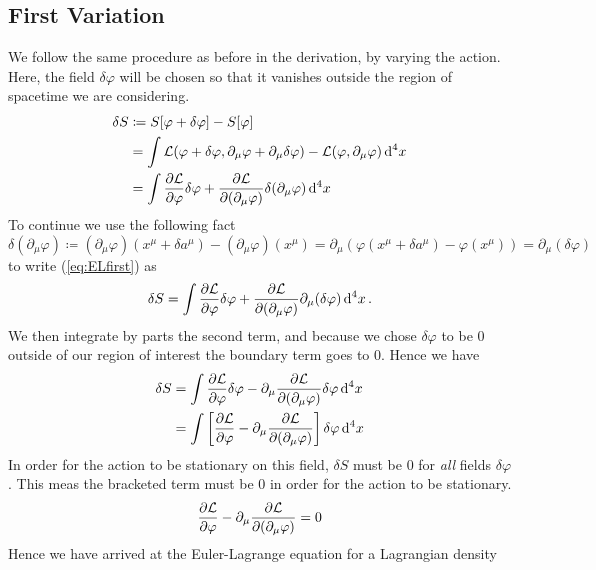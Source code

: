\subsection{First Variation}
We follow the same procedure as before in the derivation, by varying the action.
Here, the field \(\delta\varphi\) will be chosen so that it vanishes outside the
region of spacetime we are considering.
\begin{align}\label{eq:ELfirst}
    \delta S & \coloneqq S[\varphi + \delta\varphi] - S[\varphi] \nonumber\\
             & = \int \mathcal{L}(\varphi + \delta\varphi, \partial_\mu\varphi + \partial_\mu\delta\varphi) - \mathcal{L}(\varphi, \partial_\mu\varphi)\dd[4]{x} \nonumber \\
             & = \int \pdv{\mathcal{L}}{\varphi}\delta\varphi + \pdv{\mathcal{L}}{(\partial_\mu\varphi)}\delta{(\partial_\mu\varphi)}\dd[4]{x}
\end{align}
To continue we use the following fact
\begin{equation*}
    \delta(\partial_\mu\varphi)\coloneqq (\partial_\mu\varphi)(x^\mu + \delta a^\mu) - (\partial_\mu\varphi)(x^\mu) = \partial_\mu(\varphi(x^\mu + \delta a^\mu) - \varphi(x^\mu)) = \partial_\mu(\delta\varphi)
\end{equation*}
to write (\ref{eq:ELfirst}) as
\begin{equation}
    \delta S = \int \pdv{\mathcal{L}}{\varphi}\delta\varphi + \pdv{\mathcal{L}}{(\partial_\mu\varphi)}\partial_\mu(\delta\varphi)\dd[4]{x}.
\end{equation}
We then integrate by parts the second term, and because we chose
\(\delta\varphi\) to be 0 outside of our region of interest the boundary term
goes to 0. Hence we have
\begin{align}
    \delta S & = \int \pdv{\mathcal{L}}{\varphi}\delta\varphi - \partial_\mu\pdv{\mathcal{L}}{(\partial_\mu\varphi)}\delta\varphi\dd[4]{x} \nonumber\\
             & = \int \left[\pdv{\mathcal{L}}{\varphi} - \partial_\mu \pdv{\mathcal{L}}{(\partial_\mu\varphi)} \right]\delta\varphi\dd[4]{x}
\end{align}
In order for the action to be stationary on this field, \(\delta S\) must be 0
for \textit{all} fields \(\delta\varphi\). This meas the bracketed term must be
0 in order for the action to be stationary.
\begin{equation}\label{eq:ELfields}
    \pdv{\mathcal{L}}{\varphi} - \partial_\mu \pdv{\mathcal{L}}{(\partial_\mu\varphi)} = 0
\end{equation}
Hence we have arrived at the Euler-Lagrange equation for a Lagrangian density
